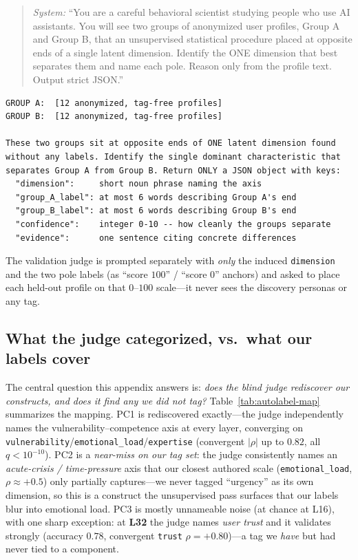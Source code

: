 \documentclass{article}
\begin{document}
\begingroup\small
\begin{quote}
\emph{System:} ``You are a careful behavioral scientist studying people who use AI
assistants. You will see two groups of anonymized user profiles, Group A and Group
B, that an unsupervised statistical procedure placed at opposite ends of a single
latent dimension. Identify the ONE dimension that best separates them and name each
pole. Reason only from the profile text. Output strict JSON.''
\end{quote}
\begin{verbatim}
GROUP A:  [12 anonymized, tag-free profiles]
GROUP B:  [12 anonymized, tag-free profiles]

These two groups sit at opposite ends of ONE latent dimension found
without any labels. Identify the single dominant characteristic that
separates Group A from Group B. Return ONLY a JSON object with keys:
  "dimension":     short noun phrase naming the axis
  "group_A_label": at most 6 words describing Group A's end
  "group_B_label": at most 6 words describing Group B's end
  "confidence":    integer 0-10 -- how cleanly the groups separate
  "evidence":      one sentence citing concrete differences
\end{verbatim}
\endgroup
\noindent The validation judge is prompted separately with \emph{only} the induced
\texttt{dimension} and the two pole labels (as ``score $100$'' / ``score $0$''
anchors) and asked to place each held-out profile on that $0$--$100$ scale---it
never sees the discovery personas or any tag.

\subsection*{What the judge categorized, vs.\ what our labels cover}
The central question this appendix answers is: \emph{does the blind judge rediscover
our constructs, and does it find any we did not tag?} Table~\ref{tab:autolabel-map}
summarizes the mapping. PC1 is rediscovered exactly---the judge independently names
the vulnerability--competence axis at every layer, converging on
\texttt{vulnerability}/\texttt{emotional\_load}/\texttt{expertise} (convergent
$|\rho|$ up to $0.82$, all $q{<}10^{-10}$). PC2 is a \emph{near-miss on our tag set}:
the judge consistently names an \emph{acute-crisis / time-pressure} axis that our
closest authored scale (\texttt{emotional\_load}, $\rho{\approx}{+}0.5$) only
partially captures---we never tagged ``urgency'' as its own dimension, so this is a
construct the unsupervised pass surfaces that our labels blur into emotional load.
PC3 is mostly unnameable noise (at chance at L16), with one sharp exception: at
\textbf{L32} the judge names \emph{user trust} and it validates strongly (accuracy
$0.78$, convergent \texttt{trust} $\rho{=}{+}0.80$)---a tag we \emph{have} but had
never tied to a component.
\end{document}

